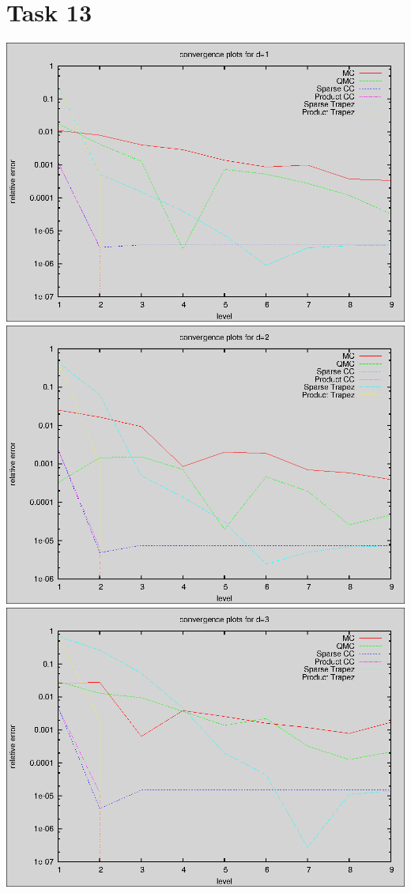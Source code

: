 \documentclass[]{article}
\begin{document}
\section*{Task 13}
\includegraphics[width=.9\textwidth]{task13_d1}\\
\includegraphics[width=.9\textwidth]{task13_d2}\\
\includegraphics[width=.9\textwidth]{task13_d4}\\
\end{document}
